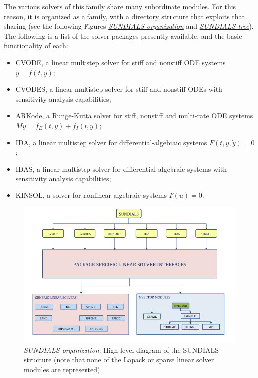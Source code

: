 \documentclass[letterpaper,10pt,english]{sphinxmanual}
\begin{document}
The various solvers of this family share many subordinate modules.
For this reason, it is organized as a family, with a directory
structure that exploits that sharing (see the following Figures
{\hyperref[Organization:sunorg1]{\emph{SUNDIALS organization}}} and {\hyperref[Organization:sunorg2]{\emph{SUNDIALS tree}}}).  The following is a list of the solver packages presently
available, and the basic functionality of each:
\begin{itemize}
\item {} 
CVODE, a linear multistep solver for stiff and nonstiff ODE systems
$\dot{y} = f(t,y)$;

\item {} 
CVODES, a linear multistep solver for stiff and nonstiff ODEs with
sensitivity analysis capabilities;

\item {} 
ARKode, a Runge-Kutta solver for stiff, nonstiff and multi-rate ODE systems
$M \dot{y} = f_E(t,y) + f_I(t,y)$;

\item {} 
IDA, a linear multistep solver for differential-algebraic systems
$F(t,y,\dot{y}) = 0$;

\item {} 
IDAS, a linear multistep solver for differential-algebraic systems with sensitivity
analysis capabilities;

\item {} 
KINSOL, a solver for nonlinear algebraic systems $F(u) = 0$.

\end{itemize}
\begin{figure}[htbp]
\centering
\capstart

\includegraphics{sunorg1.png}
\caption{\emph{SUNDIALS organization}: High-level diagram of the SUNDIALS structure (note that none of the
Lapack or sparse linear solver modules are represented).}\label{Organization:sunorg1}\end{figure}
\end{document}
